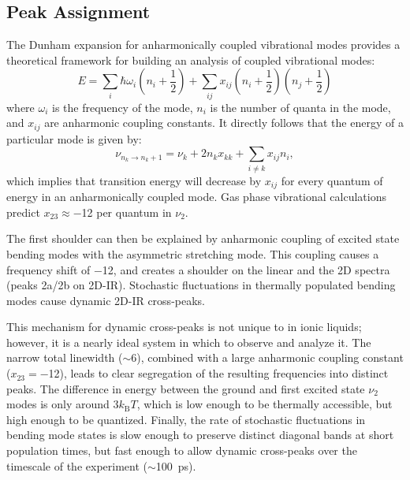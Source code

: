 \subsection{Peak Assignment}
\label{sec:nu3_assignment}
The Dunham expansion for anharmonically coupled vibrational modes provides a theoretical framework for building an analysis of coupled vibrational modes:
\begin{equation}
\label{eq:Dunham expansion}
E = \sum_{i} \hbar \omega_i \left( n_i + \frac{1}{2} \right) + \sum_{ij} x_{ij} \left( n_i + \frac{1}{2} \right) \left( n_j + \frac{1}{2} \right)
\end{equation}
\noindent where $\omega_i$ is the frequency of the mode, $n_i$ is the number of quanta in the mode, and $x_{ij}$ are anharmonic coupling constants. It directly follows that the energy of a particular mode is given by:
\begin{equation}
\label{eq:anh_coupled_energy}
	\nu_{n_k \rightarrow n_k + 1} = \nu_k + 2n_{k}x_{kk} + \sum_{i \neq k} x_{ij}n_{i},
\end{equation}
\noindent which implies that transition energy will decrease by $x_{ij}$ for every quantum of energy in an anharmonically coupled mode.\cite{Botan2008} Gas phase vibrational calculations predict $x_{23} \approx$\SI{-12}{\wavenumber} per quantum in $\nu_2$.\cite{Taylor1993a,Dressier1997a}

The first shoulder can then be explained by anharmonic coupling of excited state bending modes with the asymmetric stretching mode. This coupling causes a frequency shift of \SI{-12}{\wavenumber}, and creates a shoulder on the linear and the 2D spectra (peaks 2a/2b on 2D-IR). Stochastic fluctuations in thermally populated bending modes cause dynamic 2D-IR cross-peaks.

This mechanism for dynamic cross-peaks is not unique to  in ionic liquids; however, it is a nearly ideal system in which to observe and analyze it. The narrow total linewidth ($\sim$\SI{6}{\wavenumber}), combined with a large anharmonic coupling constant ($x_{23} =$\SI{-12}{\wavenumber}), leads to clear segregation of the resulting frequencies into distinct peaks. The difference in energy between the ground and first excited state $\nu_2$ modes is only around $3k_{\textrm{B}}T$, which is low enough to be thermally accessible, but high enough to be quantized. Finally, the rate of stochastic fluctuations in bending mode states is slow enough to preserve distinct diagonal bands at short population times, but fast enough to allow dynamic cross-peaks over the timescale of the experiment ($\sim$\SI{100}{\ps}).

